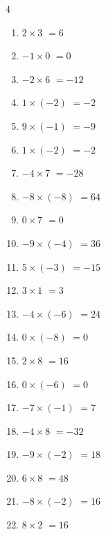 \begin{multicols}{4}
\begin{enumerate}
  \item $2\times 3$
        $=6$

  \item $-1\times 0$
        $=0$

  \item $-2\times 6$
        $=-12$

  \item $1\times (-2)$
        $=-2$

  \item $9\times (-1)$
        $=-9$

  \item $1\times (-2)$
        $=-2$

  \item $-4\times 7$
        $=-28$

  \item $-8\times (-8)$
        $=64$

  \item $0\times 7$
        $=0$

  \item $-9\times (-4)$
        $=36$

  \item $5\times (-3)$
        $=-15$

  \item $3\times 1$
        $=3$

  \item $-4\times (-6)$
        $=24$

  \item $0\times (-8)$
        $=0$

  \item $2\times 8$
        $=16$

  \item $0\times (-6)$
        $=0$

  \item $-7\times (-1)$
        $=7$

  \item $-4\times 8$
        $=-32$

  \item $-9\times (-2)$
        $=18$

\columnbreak %

  \item $6\times 8$
        $=48$

  \item $-8\times (-2)$
        $=16$

  \item $8\times 2$
        $=16$


\end{enumerate}
\end{multicols}
